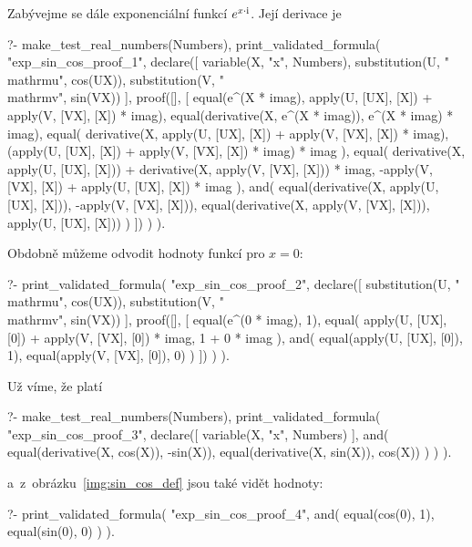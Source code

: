 Zabývejme se dále exponenciální funkcí \(e^{x \cdot \mathrm{i}}\). Její derivace je

\begin{prolog}
?-	make_test_real_numbers(Numbers),
	print_validated_formula(
		"exp_sin_cos_proof_1",
		declare([
			variable(X, "x", Numbers),
			substitution(U, "\\mathrm{u}", cos(UX)),
			substitution(V, "\\mathrm{v}", sin(VX)) 
		],
			proof([],
			[
				equal(e^(X * imag), apply(U, [UX], [X]) + apply(V, [VX], [X]) * imag),
				equal(derivative(X, e^(X * imag)), e^(X * imag) * imag),
				equal(
					derivative(X, apply(U, [UX], [X]) + apply(V, [VX], [X]) * imag),
					(apply(U, [UX], [X]) + apply(V, [VX], [X]) * imag) * imag
				),
				equal(
					derivative(X, apply(U, [UX], [X])) + derivative(X, apply(V, [VX], [X])) * imag,
					-apply(V, [VX], [X]) + apply(U, [UX], [X]) * imag
				),
				and(
					equal(derivative(X, apply(U, [UX], [X])), -apply(V, [VX], [X])),
					equal(derivative(X, apply(V, [VX], [X])), apply(U, [UX], [X]))
				)
			])
		)
	).
\end{prolog}

Obdobně můžeme odvodit hodnoty funkcí pro \(x = 0\):


\begin{prolog}
?-	print_validated_formula(
		"exp_sin_cos_proof_2",
		declare([
			substitution(U, "\\mathrm{u}", cos(UX)),
			substitution(V, "\\mathrm{v}", sin(VX)) 
		],
			proof([],
			[
				equal(e^(0 * imag), 1),
				equal(
					apply(U, [UX], [0]) + apply(V, [VX], [0]) * imag,
					1 + 0 * imag
				),
				and(
					equal(apply(U, [UX], [0]), 1),
					equal(apply(V, [VX], [0]), 0)
				)
			])
		)
	).
\end{prolog}

Už víme, že platí

\begin{prolog}
?-	make_test_real_numbers(Numbers),
	print_validated_formula(
		"exp_sin_cos_proof_3",
		declare([
			variable(X, "x", Numbers)
		],
			and(
				equal(derivative(X, cos(X)), -sin(X)),
				equal(derivative(X, sin(X)), cos(X))
			)
		)
	).
\end{prolog}


a~z~obrázku~\ref{img:sin_cos_def} jsou také vidět hodnoty: 

\begin{prolog}
?-	print_validated_formula(
		"exp_sin_cos_proof_4",
			and(
				equal(cos(0), 1),
				equal(sin(0), 0)
		)
	).
\end{prolog}

